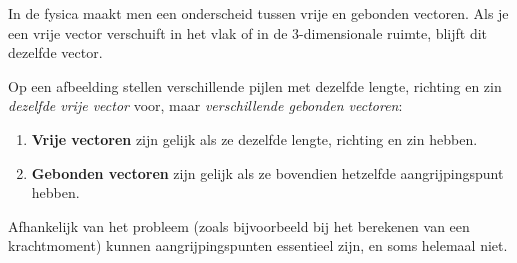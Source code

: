 \documentclass{ximera}
\begin{document}
\begin{remark}[expandable=true,title={Vrije en gebonden vectoren}]\nl
    In de fysica maakt men een onderscheid tussen vrije en gebonden vectoren. Als je een vrije vector verschuift in het vlak of in de $3$-dimensionale ruimte, blijft dit dezelfde vector.
    
    Op een afbeelding stellen verschillende pijlen met dezelfde lengte, richting en zin \textit{dezelfde vrije vector} voor, maar \textit{verschillende gebonden vectoren}:
    \begin{enumerate}
        \item \textbf{Vrije vectoren} zijn gelijk als ze dezelfde lengte, richting en zin hebben. 
        \item \textbf{Gebonden vectoren} zijn gelijk als ze bovendien hetzelfde aangrijpingspunt hebben.
    \end{enumerate}
    Afhankelijk van het probleem (zoals bijvoorbeeld bij het berekenen van een krachtmoment) kunnen aangrijpingspunten essentieel zijn, en soms helemaal niet.
    
    \captionsetup{width=0.85\textwidth}
    \begin{center}
    \end{center}
    \label{fig:vrije_vectoren}
\end{remark}
\end{document}
